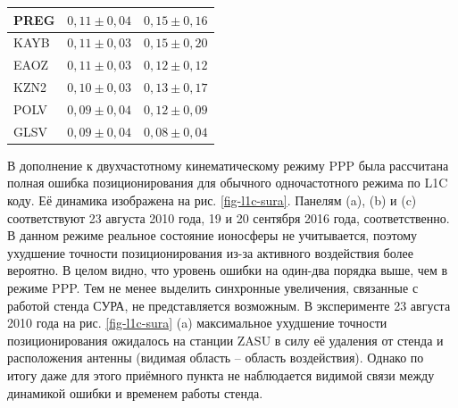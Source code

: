 \begin{longtable}{|>{\centering}p{4cm}|c|c|}
PREG    & $0,11\pm0,04$                                                                                       & $0,15\pm0,16$                                                                                    \\ \hline
KAYB    & $0,11\pm0,03$                                                                                       & $0,15\pm0,20$                                                                                    \\ \hline
EAOZ    & $0,11\pm0,03$                                                                                       & $0,12\pm0,12$                                                                                    \\ \hline
KZN2    & $0,10\pm0,03$                                                                                       & $0,13\pm0,17$                                                                                    \\ \hline
POLV    & $0,09\pm0,04$                                                                                       & $0,12\pm0,09$                                                                                    \\ \hline
GLSV    & $0,09\pm0,04$                                                                                       & $0,08\pm0,04$                                                                                    \\ \hline
\end{longtable}
\endgroup

В дополнение к двухчастотному кинематическому режиму PPP была рассчитана полная ошибка позиционирования для обычного одночастотного режима по L1C коду. 
Её динамика изображена на рис. \ref{fig-l1c-sura}.
Панелям (a), (b) и (c) соответствуют 23 августа 2010 года, 19 и 20 сентября 2016 года, соответственно.
В данном режиме реальное состояние ионосферы не учитывается, поэтому ухудшение точности позиционирования из-за активного воздействия более вероятно. 
В целом видно, что уровень ошибки на один-два порядка выше, чем в режиме PPP.
Тем не менее выделить синхронные увеличения, связанные с работой стенда СУРА, не представляется возможным. 
В эксперименте 23 августа 2010 года на рис. \ref{fig-l1c-sura} (a) максимальное ухудшение точности позиционирования ожидалось на станции ZASU в силу её удаления от стенда и расположения антенны (видимая область -- область воздействия).
Однако по итогу даже для этого приёмного пункта не наблюдается видимой связи между динамикой ошибки и временем работы стенда.

